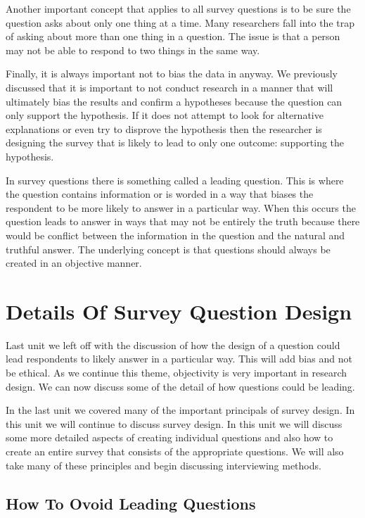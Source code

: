\documentclass[]{book}
\theoremstyle{definition}
\theoremstyle{definition}
\theoremstyle{definition}
\theoremstyle{remark}
\begin{document}
Another important concept that applies to all survey questions is to be
sure the question asks about only one thing at a time. Many researchers
fall into the trap of asking about more than one thing in a question.
The issue is that a person may not be able to respond to two things in
the same way.

Finally, it is always important not to bias the data in anyway. We
previously discussed that it is important to not conduct research in a
manner that will ultimately bias the results and confirm a hypotheses
because the question can only support the hypothesis. If it does not
attempt to look for alternative explanations or even try to disprove the
hypothesis then the researcher is designing the survey that is likely to
lead to only one outcome: supporting the hypothesis.

In survey questions there is something called a leading question. This
is where the question contains information or is worded in a way that
biases the respondent to be more likely to answer in a particular way.
When this occurs the question leads to answer in ways that may not be
entirely the truth because there would be conflict between the
information in the question and the natural and truthful answer. The
underlying concept is that questions should always be created in an
objective manner.

\hypertarget{details-of-survey-question-design}{%
\section{Details Of Survey Question
Design}\label{details-of-survey-question-design}}

Last unit we left off with the discussion of how the design of a
question could lead respondents to likely answer in a particular way.
This will add bias and not be ethical. As we continue this theme,
objectivity is very important in research design. We can now discuss
some of the detail of how questions could be leading.

In the last unit we covered many of the important principals of survey
design. In this unit we will continue to discuss survey design. In this
unit we will discuss some more detailed aspects of creating individual
questions and also how to create an entire survey that consists of the
appropriate questions. We will also take many of these principles and
begin discussing interviewing methods.

\hypertarget{how-to-ovoid-leading-questions}{%
\subsection{How To Ovoid Leading
Questions}\label{how-to-ovoid-leading-questions}}
\end{document}

